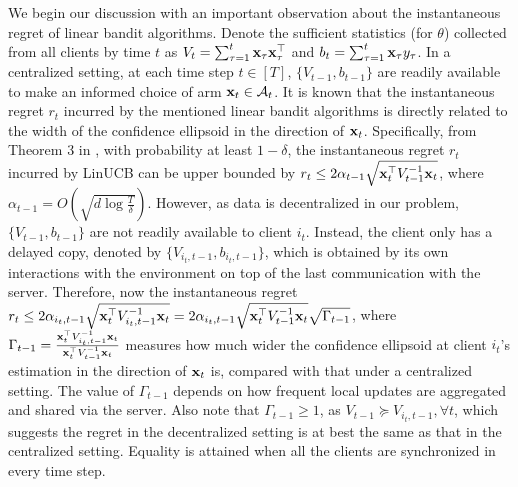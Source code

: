 We begin our discussion with an important observation about the instantaneous regret of linear bandit algorithms.
Denote the sufficient statistics (for $\theta$) collected from all clients by time $t$ as ${V}_{t}=\sum_{\tau=1}^{t}\mathbf{x}_{\tau}\mathbf{x}_{\tau}^{\top}$ and ${b}_{t}=\sum_{\tau=1}^{t}\mathbf{x}_{\tau}y_{\tau}$. In a centralized setting, at each time step $t\in[T]$, $\{{V}_{t-1},{b}_{t-1}\}$ are readily available to make an informed choice of arm $\mathbf{x}_{t}\in\mathcal{A}_{t}$. It is known that the instantaneous regret $r_{t}$ incurred by the mentioned linear bandit algorithms is directly related to the width of the confidence ellipsoid in the direction of $\mathbf{x}_{t}$. Specifically, from Theorem 3 in \citep{abbasi2011improved}, with probability at least $1-\delta$, the instantaneous regret $r_{t}$ incurred by LinUCB can be upper bounded by $r_{t}  \leq 2 \alpha_{t-1} \sqrt{\mathbf{x}_{t}^{\top}V_{t-1}^{-1}\mathbf{x}_{t}} $, where $\alpha_{t-1}=O\left(\sqrt{d\log{\frac{T}{\delta}}}\right)$.
However, as data is decentralized in our problem, $\{{V}_{t-1},{b}_{t-1}\}$ are not readily available to client $i_{t}$. Instead, the client only has a delayed copy, denoted by  $\{{V}_{i_{t},t-1},{b}_{i_{t},t-1}\}$, which is obtained by its own interactions with the environment on top of the last communication with the server. Therefore, now the instantaneous regret $r_{t} \leq  2 \alpha_{i_{t},t-1} \sqrt{\mathbf{x}_{t}^{\top}V_{i_{t},t-1}^{-1}\mathbf{x}_{t}} = 2 \alpha_{i_{t},t-1} \sqrt{\mathbf{x}_{t}^{\top}{V}_{t-1}^{-1}\mathbf{x}_{t}}\sqrt{\Gamma_{t-1}}$, where $\Gamma_{t-1} =\frac{\mathbf{x}_{t}^{\top}{V}_{i_{t},t-1}^{-1}\mathbf{x}_{t}}{\mathbf{x}_{t}^{\top}{V}_{t-1}^{-1}\mathbf{x}_{t}}$ measures how much wider the confidence ellipsoid at client $i_{t}$'s estimation in the direction of $\mathbf{x}_{t}$ is, compared with that under a centralized setting. The value of $\Gamma_{t-1}$ depends on how frequent local updates are aggregated and shared via the server. Also note that $\Gamma_{t-1} \geq 1$, as ${V}_{t-1} \succeq {V}_{i_{t},t-1},\forall t$, which suggests the regret in the decentralized setting is at best the same as that in the centralized setting. Equality is attained when all the clients are synchronized in every time step.

